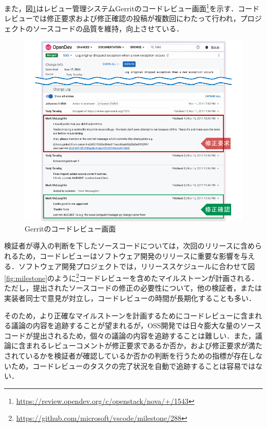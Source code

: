 \documentclass[11pt]{jreport}
\begin{document}
また，図\ref{fig:code_review}はレビュー管理システムGerritのコードレビュー画面\footnote{\url{https://review.opendev.org/c/openstack/nova/+/1543}}を示す．コードレビューでは修正要求および修正確認の投稿が複数回にわたって行われ，プロジェクトのソースコードの品質を維持，向上させている．

\begin{figure}[t]
\centerline{\includegraphics[width=1.0\linewidth]{@BSthesis2024_Kawasaki/BSthesis2024_Kawasaki_fig/code_review.pdf}}
\caption{Gerritのコードレビュー画面}
\label{fig:code_review}
\end{figure}

検証者が導入の判断を下したソースコードについては，次回のリリースに含められるため，コードレビューはソフトウェア開発のリリースに重要な影響を与える．ソフトウェア開発プロジェクトでは，リリーススケジュールに合わせて図\ref{fig:milestone}のように\footnote{\url{https://github.com/microsoft/vscode/milestone/288}}コードレビューを含めたマイルストーンが計画される．ただし，提出されたソースコードの修正の必要性について，他の検証者，または実装者同士で意見が対立し，コードレビューの時間が長期化することも多い\cite{review_time1}\cite{review_time2}．

そのため，より正確なマイルストーンを計画するためにコードレビューに含まれる議論の内容を追跡することが望まれるが，OSS開発では日々膨大な量のソースコードが提出されるため，個々の議論の内容を追跡することは難しい．また，議論に含まれるレビューコメントが修正要求であるか否か，および修正要求が満たされているかを検証者が確認しているか否かの判断を行うための指標が存在しないため，コードレビューのタスクの完了状況を自動で追跡することは容易ではない．
\end{document}
